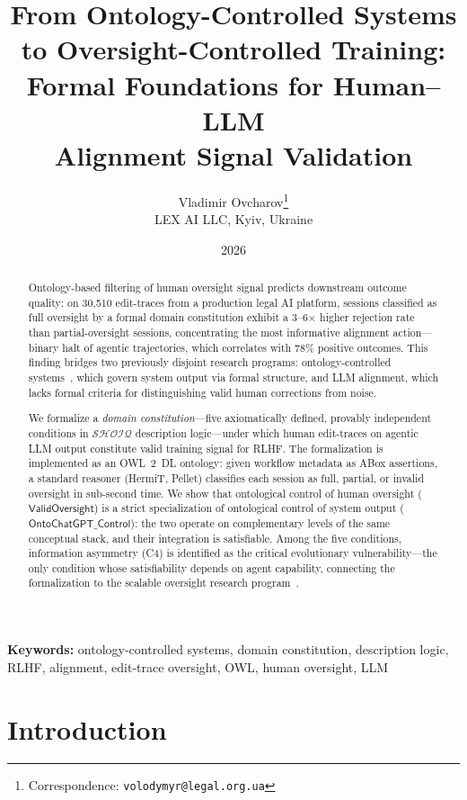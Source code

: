\documentclass[11pt]{article}
\title{%
  From Ontology-Controlled Systems \\
  to Oversight-Controlled Training: \\
  Formal Foundations for Human--LLM \\
  Alignment Signal Validation%
}
\author{
  Vladimir Ovcharov\thanks{Correspondence: \texttt{volodymyr@legal.org.ua}}\\[4pt]
  LEX AI LLC, Kyiv, Ukraine\\
}
\date{2026}
\newcommand{\DL}{\ensuremath{\mathcal{SHOIQ}}\xspace}
\begin{document}
\maketitle

\begin{abstract}
Ontology-based filtering of human oversight signal predicts downstream outcome quality: on 30{,}510 edit-traces from a production legal AI platform, sessions classified as full oversight by a formal domain constitution exhibit a 3--6$\times$ higher rejection rate than partial-oversight sessions, concentrating the most informative alignment action---binary halt of agentic trajectories, which correlates with 78\% positive outcomes.
This finding bridges two previously disjoint research programs: ontology-controlled systems~\citep{palagin2006architecture, palagin2023ontochatgpt}, which govern system output via formal structure, and LLM alignment, which lacks formal criteria for distinguishing valid human corrections from noise.

We formalize a \emph{domain constitution}---five axiomatically defined, provably independent conditions in \DL description logic---under which human edit-traces on agentic LLM output constitute valid training signal for RLHF.
The formalization is implemented as an OWL~2~DL ontology: given workflow metadata as ABox assertions, a standard reasoner (HermiT, Pellet) classifies each session as full, partial, or invalid oversight in sub-second time.
We show that ontological control of human oversight ($\mathsf{ValidOversight}$) is a strict specialization of ontological control of system output ($\mathsf{OntoChatGPT\_Control}$): the two operate on complementary levels of the same conceptual stack, and their integration is satisfiable.
Among the five conditions, information asymmetry (C4) is identified as the critical evolutionary vulnerability---the only condition whose satisfiability depends on agent capability, connecting the formalization to the scalable oversight research program~\citep{bowman2022measuring}.
\end{abstract}

\noindent\textbf{Keywords:} ontology-controlled systems, domain constitution, description logic, RLHF, alignment, edit-trace oversight, OWL, human oversight, LLM

\section{Introduction}
\label{sec:intro}
\end{document}
